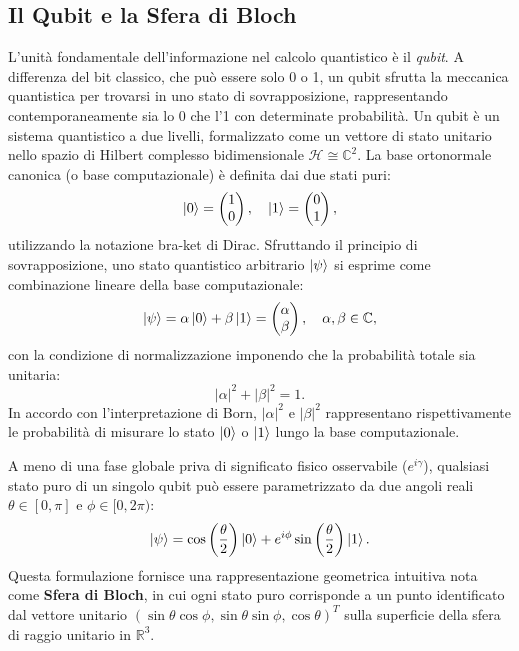 \subsection{Il Qubit e la Sfera di Bloch}
L'unità fondamentale dell'informazione nel calcolo quantistico è il \textit{qubit}. A differenza del bit classico, che può essere solo 0 o 1, un qubit sfrutta la meccanica quantistica per trovarsi in uno stato di sovrapposizione, rappresentando contemporaneamente sia lo 0 che l'1 con determinate probabilità. Un qubit è un sistema quantistico a due livelli, formalizzato come un vettore di stato unitario nello spazio di Hilbert complesso bidimensionale $\mathcal{H} \cong \mathbb{C}^2$. La base ortonormale canonica (o base computazionale) è definita dai due stati puri:
\begin{equation}
\ket{0} = \begin{pmatrix} 1 \\ 0 \end{pmatrix}, \quad \ket{1} = \begin{pmatrix} 0 \\ 1 \end{pmatrix},
\end{equation}
utilizzando la notazione bra-ket di Dirac. Sfruttando il principio di sovrapposizione, uno stato quantistico arbitrario $\ket{\psi}$ si esprime come combinazione lineare della base computazionale:
\begin{equation}
\ket{\psi} = \alpha \ket{0} + \beta \ket{1} = \begin{pmatrix} \alpha \\ \beta \end{pmatrix}, \quad \alpha, \beta \in \mathbb{C},
\end{equation}
con la condizione di normalizzazione imponendo che la probabilità totale sia unitaria:
\begin{equation}
|\alpha|^2 + |\beta|^2 = 1.
\end{equation}
In accordo con l'interpretazione di Born, $|\alpha|^2$ e $|\beta|^2$ rappresentano rispettivamente le probabilità di misurare lo stato $\ket{0}$ o $\ket{1}$ lungo la base computazionale.

A meno di una fase globale priva di significato fisico osservabile ($e^{i\gamma}$), qualsiasi stato puro di un singolo qubit può essere parametrizzato da due angoli reali $\theta \in [0, \pi]$ e $\phi \in [0, 2\pi)$:
\begin{equation}
\ket{\psi} = \cos\left(\frac{\theta}{2}\right)\ket{0} + e^{i\phi}\sin\left(\frac{\theta}{2}\right)\ket{1}.
\end{equation}
Questa formulazione fornisce una rappresentazione geometrica intuitiva nota come \textbf{Sfera di Bloch}, in cui ogni stato puro corrisponde a un punto identificato dal vettore unitario $(\sin\theta\cos\phi, \sin\theta\sin\phi, \cos\theta)^T$ sulla superficie della sfera di raggio unitario in $\mathbb{R}^3$.

